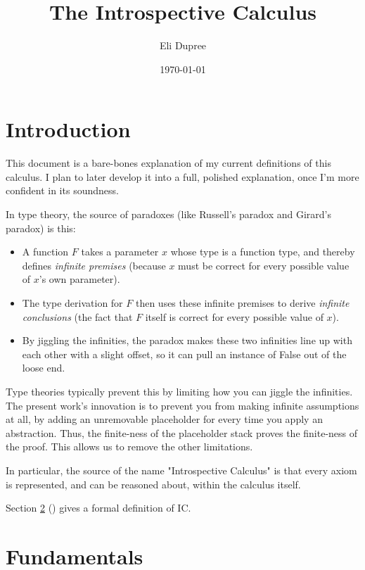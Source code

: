 \documentclass{article}
\title{The Introspective Calculus}
\author{Eli Dupree}
\date{\today}
\begin{document}
  \maketitle
  
  \section{Introduction}
  
  This document is a bare-bones explanation of my current definitions of this calculus.
  I plan to later develop it into a full, polished explanation, once I'm more confident in its soundness.
  
  In type theory, the source of paradoxes (like Russell's paradox and Girard's paradox) is this:
  
  \begin{itemize}
    \item A function $F$ takes a parameter $x$ whose type is a function type, and thereby defines \emph{infinite premises} (because $x$ must be correct for every possible value of $x$'s own parameter).
    \item The type derivation for $F$ then uses these infinite premises to derive \emph{infinite conclusions} (the fact that $F$ itself is correct for every possible value of $x$).
    \item By jiggling the infinities, the paradox makes these two infinities line up with each other with a slight offset, so it can pull an instance of False out of the loose end.
  \end{itemize}
  
  Type theories typically prevent this by limiting how you can jiggle the infinities.
  The present work's innovation is to prevent you from making infinite assumptions at all, by adding an unremovable placeholder for every time you apply an abstraction. Thus, the finite-ness of the placeholder stack proves the finite-ness of the proof.
  This allows us to remove the other limitations.
  
  In particular, the source of the name "Introspective Calculus" is that every axiom is represented, and can be reasoned about, within the calculus itself.
  
  Section \ref{fundamentals} (\textit{}) gives a formal definition of IC.  

  \section{Fundamentals}\label{fundamentals}
\end{document}
